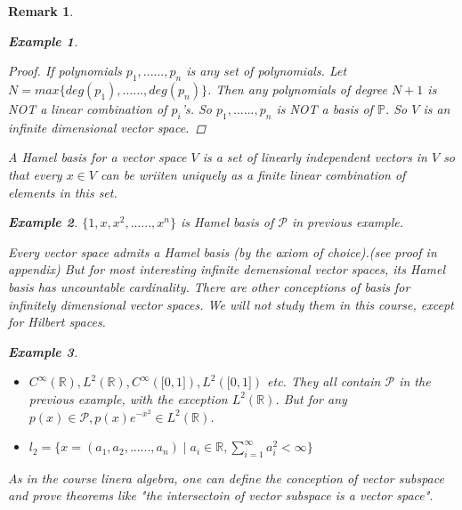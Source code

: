 \documentclass{article}
\newtheorem*{remark}{Remark}
\newtheorem*{example}{Example}
\begin{document}
\begin{remark}
\begin{example}
\begin{itemize}
            \begin{proof}
                If polynomials $p_1, ......, p_n$ is any set of polynomials. 
                Let $N=max\{deg(p_1), ......, deg(p_n)\}$.
                Then any polynomials of degree $N + 1$ is NOT a linear combination of $p_i$'s.
                So ${p_1, ......, p_n}$ is NOT a basis of $\mathbb{P}$.
                So $V$ is an infinite dimensional vector space.
            \end{proof}
        \end{itemize}
    \end{example}
    A Hamel basis for a vector space $V$ is a set of linearly independent vectors in $V$ so that every $x \in V$
    can be wriiten uniquely as a finite linear combination of elements in this set.
    \begin{example}
        $\{1, x, x^2, ......, x^n\}$ is Hamel basis of $\mathcal{P}$ in previous example.
    \end{example}
    Every vector space admits a Hamel basis (by the axiom of choice).(see proof in appendix)
    But for most interesting infinite demensional vector spaces, its Hamel basis has uncountable cardinality.
    There are other conceptions of basis for infinitely dimensional vector spaces.
    We will not study them in this course, except for Hilbert spaces.
    \begin{example}
        \begin{itemize}  \hfill
            \item $C^{\infty}(\mathbb{R}), L^2(\mathbb{R}), C^{\infty}(\bigl[0, 1\bigr]), L^2(\bigl[0, 1\bigr])$ etc.
            They all contain $\mathcal{P}$ in the previous example, with the exception $L^2(\mathbb{R})$.
            But for any $p(x) \in \mathcal{P}, p(x)e^{-x^2} \in L^2(\mathbb{R})$.
            \item $l_2 = \{x=(a_1, a_2, ......, a_n)\mid a_i \in \mathbb{R}, \sum_{i=1}^{\infty}a_i^2 < \infty\}$
        \end{itemize}
    \end{example}
    As in the course linera algebra, one can define the conception of vector subspace and prove theorems like
    "the intersectoin of vector subspace is a vector space".
\end{remark}
\end{document}
